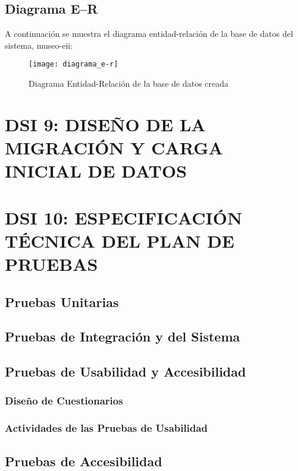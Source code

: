 \subsection{Diagrama E--R} 
A continuación se muestra el diagrama entidad-relación de la base de datos del sistema, museo-eii:
\begin{figure}[H]
\centering
\texttt{[image: diagrama\_e-r]}
\caption{Diagrama Entidad-Relación de la base de datos creada}
\end{figure}

\newpage
\section{DSI 9: DISEÑO DE LA MIGRACIÓN Y CARGA INICIAL DE DATOS}


\newpage
\section{DSI 10: ESPECIFICACIÓN TÉCNICA DEL PLAN DE PRUEBAS}

\subsection{Pruebas Unitarias} 

\subsection{Pruebas de Integración y del Sistema} 

\subsection{Pruebas de Usabilidad y Accesibilidad} 

\subsubsection{Diseño de Cuestionarios} 

\subsubsection{Actividades de las Pruebas de Usabilidad} 


\subsection{Pruebas de Accesibilidad} 


